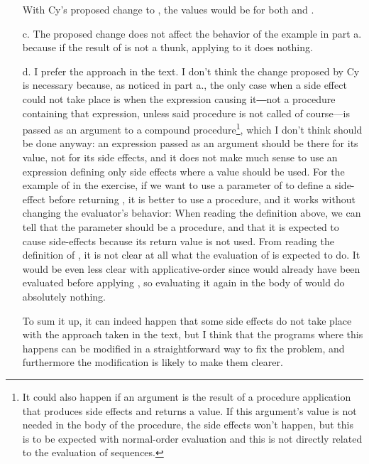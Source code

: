 \begin{exe}[4.30]
\begin{itemize}
	    With Cy’s proposed change to , the values would 
	    be  for both  and .
	\item[c.] The proposed change does not affect the behavior of the 
	    example in part a. because if the result of  is not 
	    a thunk, applying  to it does nothing.
	\item[d.] I prefer the approach in the text. I don’t think the change 
	    proposed by Cy is necessary because, as noticed in part a., the only 
	    case when a side effect could not take place is when the expression 
	    causing it―not a procedure containing that expression, unless said 
	    procedure is not called of course—is passed as an argument to 
	    a compound procedure\footnote{It could also happen if an argument is 
	    the result of a procedure application that produces side effects and 
	    returns a value. If this argument’s value is not needed in the body 
	    of the procedure, the side effects won’t happen, but this is to be 
	    expected with normal-order evaluation and this is not directly 
	    related to the evaluation of sequences.}, which I don’t think should 
	    be done anyway: an expression passed as an argument should be there 
	    for its value, not for its side effects, and it does not make much 
	    sense to use an expression defining only side effects where a value 
	    should be used. For the example of  in the exercise, if we 
	    want to use a parameter of  to define a side-effect before 
	    returning , it is better to use a procedure, and it works 
	    without changing the evaluator’s behavior:
	    When reading the definition above, we can tell that the parameter 
	     should be a procedure, and that it is expected to cause 
	    side-effects because its return value is not used. From reading the 
	    definition of , it is not clear at all what the evaluation 
	    of  is expected to do. It would be even less clear with 
	    applicative-order since  would already have been evaluated 
	    before applying , so evaluating it again in the body of 
	     would do absolutely nothing.

	    To sum it up, it can indeed happen that some side effects do not 
	    take place with the approach taken in the text, but I think that the 
	    programs where this happens can be modified in a straightforward way 
	    to fix the problem, and furthermore the modification is likely to 
	    make them clearer.
    \end{itemize}
\end{exe}

